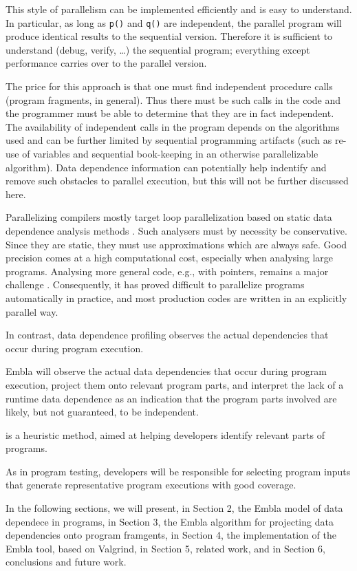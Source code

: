 This style of parallelism can be implemented efficiently and is easy
to understand.  In particular, as long as {\tt p()} and {\tt q()} are
independent, the parallel program will produce identical results to
the sequential version.  Therefore it is sufficient to understand
(debug, verify, \ldots) the sequential program; everything except
performance carries over to the parallel version.

The price for this approach is that one must find independent
procedure calls (program fragments, in general).  Thus there must be
such calls in the code and the programmer must be able to determine
that they are in fact independent.  The availability of independent
calls in the program depends on the algorithms used and can be further
limited by sequential programming artifacts (such as re-use of
variables and sequential book-keeping in an otherwise parallelizable
algorithm).  Data dependence information can potentially help
indentify and remove such obstacles to parallel execution, but this
will not be further discussed here.

Parallelizing compilers mostly target loop parallelization based on
static data dependence analysis methods \cite{}.  Such analysers must
by necessity be conservative.  Since they are static, they must use
approximations which are always safe.  Good precision comes at a high
computational cost, especially when analysing large programs.
Analysing more general code, e.g., with pointers, remains a major
challenge \cite{}.  Consequently, it has proved difficult to
parallelize programs automatically in practice, and most production
codes are written in an explicitly parallel way.

In contrast, data dependence profiling observes the actual
dependencies that occur during program execution.


  Embla will
observe the actual data dependencies that occur during program
execution, project them onto relevant program parts, and interpret the
lack of a runtime data dependence as an indication that the program
parts involved are likely, but not guaranteed, to be independent.

is a heuristic method, aimed at
helping developers identify relevant parts of programs.

  As
in program testing, developers will be responsible for selecting
program inputs that generate representative program executions with
good coverage.

In the following sections, we will present, in Section 2, the Embla
model of data dependece in programs, in Section 3, the Embla algorithm
for projecting data dependencies onto program framgents, in Section 4,
the implementation of the Embla tool, based on Valgrind, in Section 5,
related work, and in Section 6, conclusions and future work.

